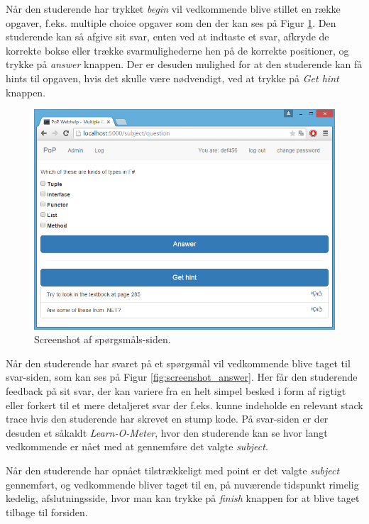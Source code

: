 \documentclass[11pt, a4paper]{article}
\begin{document}
Når den studerende har trykket \emph{begin} vil vedkommende blive stillet en række opgaver, f.eks. multiple choice opgaver som den der kan ses på Figur \ref{fig:screenshot_question}. Den studerende kan så afgive sit svar, enten ved at indtaste et svar, afkryde de korrekte bokse eller trække svarmulighederne hen på de korrekte positioner, og trykke på \emph{answer} knappen. Der er desuden mulighed for at den studerende kan få hints til opgaven, hvis det skulle være nødvendigt, ved at trykke på \emph{Get hint} knappen.

\begin{figure}[htpb]
    \centering
    \includegraphics[width=1\linewidth]{figures/interface/question.png}
    \caption{Screenshot af spørgsmåls-siden.}
    \label{fig:screenshot_question}
\end{figure}

Når den studerende har svaret på et spørgsmål vil vedkommende blive taget til svar-siden, som kan ses på Figur \ref{fig:screenshot_answer}. Her får den studerende feedback på sit svar, der kan variere fra en helt simpel besked i form af rigtigt eller forkert til et mere detaljeret svar der f.eks. kunne indeholde en relevant stack trace hvis den studerende har skrevet en stump kode. På svar-siden er der desuden et såkaldt \emph{Learn-O-Meter}, hvor den studerende kan se hvor langt vedkommende er nået med at gennemføre det valgte \emph{subject}.

Når den studerende har opnået tilstrækkeligt med point er det valgte \emph{subject} gennemført, og vedkommende bliver taget til en, på nuværende tidspunkt rimelig kedelig, afslutningsside, hvor man kan trykke på \emph{finish} knappen for at blive taget tilbage til forsiden.
\end{document}
